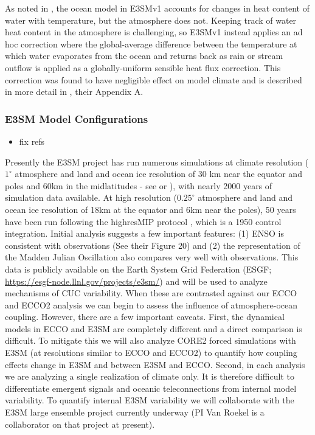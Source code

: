 As noted in \cite{golaz2018doe}, the ocean model in E3SMv1 accounts for changes in heat content of water with temperature, but the atmosphere does not. Keeping track of water heat content in the atmosphere is challenging, so E3SMv1 instead applies an ad hoc correction where the global-average difference between the temperature at which water evaporates from the ocean and returns back as rain or stream outflow is applied as a globally-uniform sensible heat flux correction. This correction was found to have negligible effect on model climate and is described in more detail in \cite{golaz2018doe}, their Appendix A.   

\subsubsection{E3SM Model Configurations}
\color{red}
\begin{itemize}
    \item fix refs
\end{itemize}
\color{black}

Presently the E3SM project has run numerous simulations at climate resolution ($1^\circ$ atmosphere and land and ocean ice resolution of 30 km near the equator and poles and 60km in the midlatitudes - see \citet{petersen2019evaluation} or \citet{golaz2018doe}), with nearly 2000 years of simulation data available.  At high resolution ($0.25^\circ$ atmosphere and land and ocean ice resolution of 18km at the equator and 6km near the poles), 50 years have been run following the highresMIP protocol \citep{haarsma2016high}, which is a 1950 control integration.  Initial analysis suggests a few important features: (1) ENSO is consistent with observations (See \citet{golaz2018doe} their Figure 20) and (2) the representation of the Madden Julian Oscillation also compares very well with observations\citep{golaz2018doe}.  This data is publicly available on the Earth System Grid Federation (ESGF; \url{https://esgf-node.llnl.gov/projects/e3sm/}) and will be used to analyze mechanisms of CUC variability.  When these are contrasted against our ECCO and ECCO2 analysis we can begin to assess the influence of atmosphere-ocean coupling.  However, there are a few important caveats.  First, the dynamical models in ECCO and E3SM are completely different and a direct comparison is difficult.  To mitigate this we will also analyze CORE2 forced \citep{large2009global} simulations with E3SM (at resolutions similar to ECCO and ECCO2) to quantify how coupling effects change in E3SM and between E3SM and ECCO.  Second, in each analysis we are analyzing a single realization of climate only.  It is therefore difficult to differentiate emergent signals and oceanic teleconnections from internal model variability.  To quantify internal E3SM variability we will collaborate with the E3SM large ensemble project currently underway (PI Van Roekel is a collaborator on that project at present).

